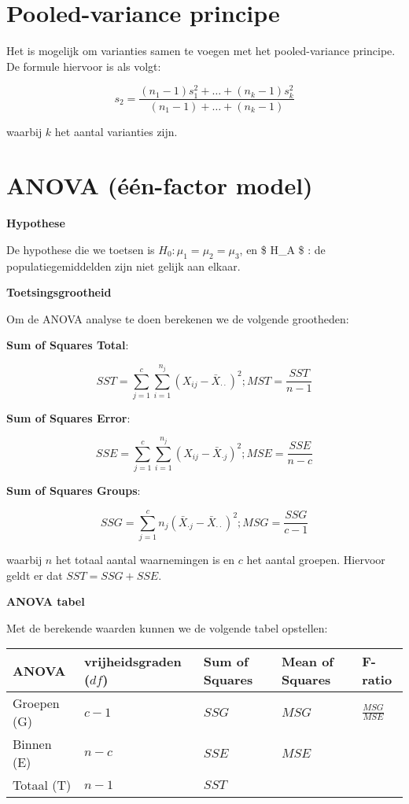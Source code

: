 \documentclass[11pt]{article}
\begin{document}
    
    \hypertarget{pooled-variance-principe}{%
\section{Pooled-variance principe}\label{pooled-variance-principe}}

    Het is mogelijk om varianties samen te voegen met het pooled-variance
principe. De formule hiervoor is als volgt:

    \[ s_2 = \dfrac{(n_1 - 1)s_1^2 + \ldots + (n_k - 1)s_k^2}{(n_1 - 1) + \ldots + (n_k - 1)} \]

    waarbij \(k\) het aantal varianties zijn.

    \hypertarget{anova-uxe9uxe9n-factor-model}{%
\section{ANOVA (één-factor model)}\label{anova-uxe9uxe9n-factor-model}}

    \textbf{Hypothese}

De hypothese die we toetsen is \(H_0 : \mu_1 = \mu_2 = \mu_3\), en \$
H\_A \$ : de populatiegemiddelden zijn niet gelijk aan elkaar.

    \textbf{Toetsingsgrootheid}

Om de ANOVA analyse te doen berekenen we de volgende grootheden:

\textbf{Sum of Squares Total}:

\[SST = \sum\limits_{j=1}^c \sum\limits_{i=1}^{n_j}\left( X_{ij} - \bar{X}_{\cdot \cdot}\right)^2; MST = \dfrac{SST}{n-1}\]

\textbf{Sum of Squares Error}:

\[SSE = \sum\limits_{j=1}^c \sum\limits_{i=1}^{n_j}\left( X_{ij} - \bar{X}_{\cdot j}\right)^2; MSE = \dfrac{SSE}{n-c}\]

\textbf{Sum of Squares Groups}:

\[SSG = \sum\limits_{j=1}^c n_j \left( \bar{X}_{\cdot j} - \bar{X}_{\cdot \cdot}\right)^2; MSG = \dfrac{SSG}{c-1}\]

waarbij \(n\) het totaal aantal waarnemingen is en \(c\) het aantal
groepen. Hiervoor geldt er dat \(SST = SSG + SSE\).

\textbf{ANOVA tabel}

Met de berekende waarden kunnen we de volgende tabel opstellen:

\begin{longtable}[]{@{}lllll@{}}
\toprule
ANOVA & vrijheidsgraden (\(df\)) & Sum of Squares & Mean of Squares &
F-ratio\tabularnewline
\midrule
\endhead
Groepen (G) & \(c-1\) & \(SSG\) & \(MSG\) &
\(\frac{MSG}{MSE}\)\tabularnewline
Binnen (E) & \(n-c\) & \(SSE\) & \(MSE\) &\tabularnewline
Totaal (T) & \(n-1\) & \(SST\) & &\tabularnewline
\bottomrule
\end{longtable}
\end{document}
